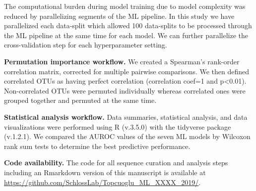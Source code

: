 \documentclass[11pt,]{article}
\begin{document}
The computational burden during model training due to model complexity
was reduced by parallelizing segments of the ML pipeline. In this study
we have parallelized each data-split which allowed 100 data-splits to be
processed through the ML pipeline at the same time for each model. We
can further parallelize the cross-validation step for each
hyperparameter setting.

\textbf{Permutation importance workflow.} We created a Spearman's
rank-order correlation matrix, corrected for multiple pairwise
comparisons. We then defined correlated OTUs as having perfect
correlation (correlation coef=1 and p\textless{}0.01). Non-correlated
OTUs were permuted individually whereas correlated ones were grouped
together and permuted at the same time.

\textbf{Statistical analysis workflow.} Data summaries, statistical
analysis, and data visualizations were performed using R (v.3.5.0) with
the tidyverse package (v.1.2.1). We compared the AUROC values of the
seven ML models by Wilcoxon rank sum tests to determine the best
predictive performance.

\textbf{Code availability.} The code for all sequence curation and
analysis steps including an Rmarkdown version of this manuscript is
available at
\url{https://github.com/SchlossLab/Topcuoglu_ML_XXXX_2019/}.

\newpage
\end{document}
